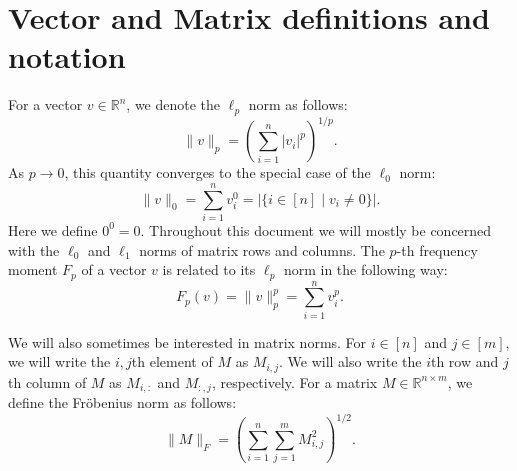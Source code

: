 \documentclass{report}
\begin{document}
\section{Vector and Matrix definitions and notation} \label{sec:matdef}



For a vector $v \in \mathbb{R}^n$, we denote the $\ell_p$ norm as follows:
%
\begin{equation} \label{eq:pnorm}
\|v\|_p = \left( \sum\limits_{i=1}^n |v_i|^p \right )^{1/p}.
\end{equation}
%
As $p \rightarrow 0$, this quantity converges to the special case of the $\ell_0$ norm:
%
\begin{equation} \label{eq:0norm}
\|v\|_0 = \sum_{i=1}^n v_i^0 =  | \{ i \in [n] \mid v_i \neq 0 \} |.
\end{equation}
%
Here we define $0^0 = 0$. 
Throughout this document we will mostly be concerned with the $\ell_0$ and $\ell_1$ norms of matrix rows and columns. 
The $p$-th frequency moment $F_p$ of a vector $v$ is related to its $\ell_p$ norm in the following way:
%
\begin{equation} \label{eq:Fp}
F_p(v) = \|v\|_p^p = \sum\limits_{i=1}^n v_i^p.
\end{equation}
%
%




We will also sometimes be interested in matrix norms. 
For $i \in [n]$ and $j \in [m]$, we will write the $i,j$th element of $M$ as $M_{i,j}$. 
We will also write the $i$th row and $j$th column of $M$ as $M_{i,:}$ and $M_{:,j}$, respectively. 
For a matrix $M \in \mathbb{R}^{n \times m}$, we define the Fr\"obenius norm as follows:
%
\begin{equation} \label{eq:fnorm}
\|M\|_F = \left( \sum\limits_{i=1}^n \sum\limits_{j=1}^m M_{i,j}^2 \right )^{1/2}.
\end{equation}
%
\end{document}
